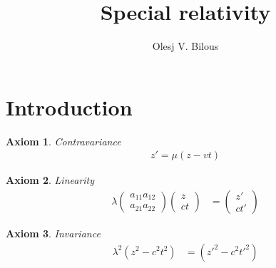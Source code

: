 \documentclass{amsart}
\newtheorem{axm}{Axiom}[section]
\begin{document}
	\title{Special relativity}
	\author{Olesj V. Bilous}
	\maketitle

	\section{Introduction}
	\begin{axm}
		Contravariance
		\begin{align*}
			z' = \mu(z - vt)
		\end{align*}
	\end{axm}
	\begin{axm}
		Linearity
		\begin{align*}
			\lambda
			\begin{pmatrix}
				a_{11} a_{12} \\
				a_{21} a_{22}
			\end{pmatrix}
			\begin{pmatrix}
				z \\
				ct
			\end{pmatrix}
			& =
			\begin{pmatrix}
				z' \\
				ct'
			\end{pmatrix}
		\end{align*}
	\end{axm}
	\begin{axm}
		Invariance
		\begin{align*}
			\lambda^2(z^2 - c^2t^2) & = ({z'}^2 - c^2{t'}^2)
		\end{align*}
	\end{axm}
\end{document}
